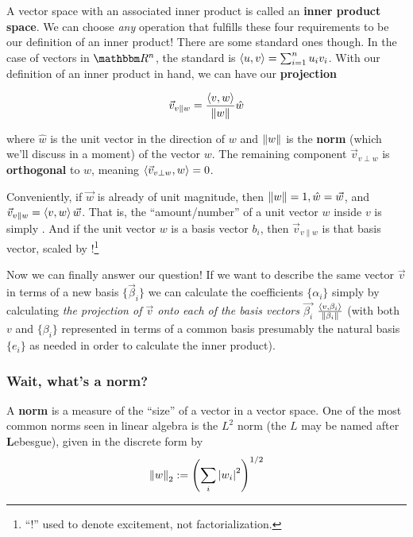 \documentclass[letterpaper,12pt]{report}
\begin{document}
A vector space with an associated inner product is called an \textbf{inner product space}.
We can choose \emph{any} operation that fulfills these four requirements to be our
definition of an inner product! There are some standard ones though.
In the case of vectors in \(\domain{R^n}\), the standard is
\(\left<u,v\right> = \sum_{i=1}^{n}u_i v_i \).
With our definition of an inner product in hand, we can have our \textbf{projection}

\begin{equation}
\vec{v}_{v\parallel w} = \frac{\left<v,w\right>}{\norm{w}} \hat{w}
\end{equation}\label{equation:projection}

where \(\hat{w}\) is the unit vector in the direction of \(w\) and \(\norm{w}\)
is the
\textbf{norm} (which we'll discuss in a moment)
of the vector \(w\).
The remaining component \(\vec{v}_{v\perp w}\) is \textbf{orthogonal} to \(w\),
meaning \(\left<\vec{v}_{v\perp w},w\right> = 0\).
\par 

Conveniently, if \(\vec{w}\) is already of unit magnitude, 
then \(\norm{w} = 1, \hat{w} = \vec{w}\), and
\(\vec{v}_{v\parallel w} = \left<v,w\right>\vec{w}\).
That is, the ``amount/number'' of a 
unit vector \(w\) inside \(v\) is simply .
And if the unit vector \(w\) is a basis vector \(b_i\), then 
\(\vec{v}_{v\parallel w}\) is 
that basis vector, scaled by !\footnote{
  ``!'' used to denote excitement, not factorialization.
}
\par

Now we can finally answer our question! 
If we want to describe the same vector \(\vec{v}\)
in terms of a new basis \(\{\vec{\beta}_i\}\) 
we can calculate the coefficients \(\{\alpha_i\}\)
simply by calculating \emph{the projection of \(\vec{v}\)
onto each of the basis vectors \(\vec{\beta_i}\)}
\(\frac{\left<v,\beta_i\right>}{\norm{\beta_i}}\)
(with both \(v\) and \(\{\beta_i\}\) represented
in terms of a common basis
\textemdash{} presumably the natural basis \(\{e_i\}\) \textemdash{}
as needed in order to calculate the inner product).

\subsubsection*{Wait, what's a norm?}

A \textbf{norm} is a measure of the ``size''
of a vector in a vector space.
One of the most common norms seen
in linear algebra is
the \(L^2\) norm 
(the \(L\) may be named after \textbf{L}ebesgue), 
given in the discrete form by
\[\norm{w}_2 := \left(\sum_{i} \abs{w_i}^2\right)^{1/2}\]
\end{document}

